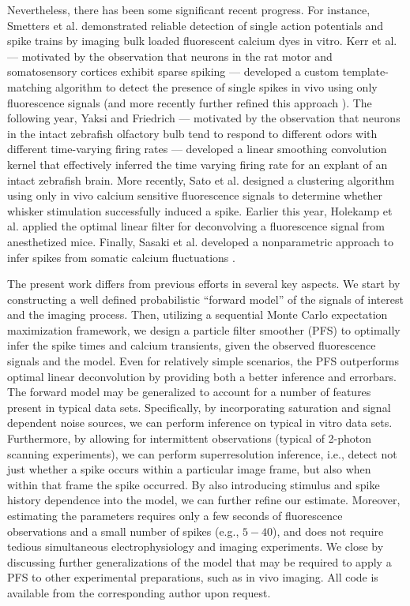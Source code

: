 \documentclass[10pt]{article}
\begin{document}
Nevertheless, there has been some significant recent progress.  For instance, Smetters et al.  \cite{SmettersYuste99} demonstrated reliable detection of  single action potentials and spike trains by imaging bulk loaded fluorescent calcium dyes in vitro. Kerr et al. \cite{KerrHelmchen05} --- motivated by the observation that neurons in the rat motor and somatosensory cortices exhibit sparse spiking --- developed a custom template-matching algorithm to detect the presence of single spikes in vivo using only fluorescence signals (and more recently further refined this approach \cite{GreenbergKerr08}).  The following year, Yaksi and Friedrich  \cite{YaksiFriedrich06} --- motivated by the observation that neurons in the intact zebrafish olfactory bulb tend to respond to different odors with different time-varying firing rates --- developed a linear smoothing convolution kernel that effectively inferred the time varying firing rate for an explant of an intact zebrafish brain.  More recently, Sato et al.  \cite{SatoSvoboda07} designed a clustering algorithm using only in vivo calcium sensitive fluorescence signals to determine whether whisker stimulation successfully induced a spike. Earlier this year, Holekamp et al. \cite{HolekampHoly08} applied the optimal linear filter for deconvolving a fluorescence signal from anesthetized mice. Finally, Sasaki et al. developed a nonparametric approach to infer spikes from somatic calcium fluctuations \cite{SasakiIkegaya08}. 

The present work differs from previous efforts in several key aspects.  We start by constructing a well defined probabilistic ``forward model'' of the signals of interest and the imaging process.  Then, utilizing a sequential Monte Carlo expectation maximization framework, we design a particle filter smoother (PFS) to optimally infer the spike times and calcium transients, given the observed fluorescence signals and the model. Even for relatively simple scenarios, the PFS outperforms optimal linear deconvolution by providing both a better inference and errorbars. The forward model may be generalized to account for a number of features present in typical data sets. Specifically, by incorporating saturation and signal dependent noise sources, we can perform inference on typical in vitro data sets.  Furthermore, by allowing for intermittent observations (typical of 2-photon scanning experiments), we can perform superresolution inference, i.e., detect not just whether a spike occurs within a particular image frame, but also when within that frame the spike occurred. By also introducing stimulus and spike history dependence into the model, we can further refine our estimate. Moreover, estimating the parameters requires only a few seconds of fluorescence observations and a small number of spikes (e.g., $5-40$), and does not require tedious simultaneous electrophysiology and imaging experiments. We close by discussing further generalizations of the model that may be required to apply a PFS to other experimental preparations, such as in vivo imaging. All code is available from the corresponding author upon request.
\end{document}
